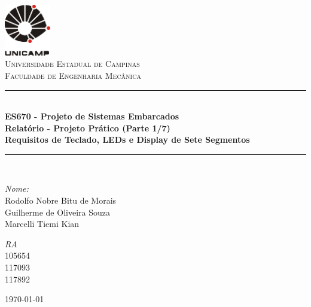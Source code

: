 
\begin{titlepage}
\begin{center}

\newcommand{\HRule}{\rule{\linewidth}{0.5mm}}
\includegraphics[width=0.15\textwidth]{logoUnicamp}~\\[1cm]

\textsc{\LARGE Universidade Estadual de Campinas}\\[1.5cm]

\textsc{\Large Faculdade de Engenharia Mecânica}\\[0.5cm]

\HRule \\[0.4cm]
{ \huge \bfseries ES670 - Projeto de Sistemas Embarcados\\ \vspace{1cm} Relatório - Projeto Prático (Parte 1/7) \\
\Large{Requisitos de Teclado, LEDs e Display de Sete Segmentos} \\[0.4cm] }

\HRule \\[1.5cm]

\begin{minipage}{0.6\textwidth}
\begin{flushleft} \large
\emph{Nome:}\\
Rodolfo Nobre Bitu de Morais\\Guilherme de Oliveira Souza\\ Marcelli Tiemi Kian
\end{flushleft}
\end{minipage}
\begin{minipage}{0.2\textwidth}
\begin{flushright} \large
\emph{RA}\\ 105654\\117093\\
117892
\end{flushright}
\end{minipage}

\vfill

{\large \today}

\end{center}
\end{titlepage}
